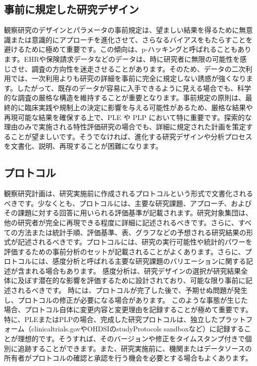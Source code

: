 \documentclass[
  11pt]{book}
\theoremstyle{definition}
\theoremstyle{definition}
\theoremstyle{definition}
\theoremstyle{definition}
\theoremstyle{remark}
\begin{document}
\subsection{事前に規定した研究デザイン}\label{ux4e8bux524dux306bux898fux5b9aux3057ux305fux7814ux7a76ux30c7ux30b6ux30a4ux30f3}

観察研究のデザインとパラメータの事前規定は、望ましい結果を得るために無意識または意識的にアプローチを進化させて、さらなるバイアスをもたらすことを避けるために極めて重要です。この傾向は、p-ハッキングと呼ばれることもあります。EHRや保険請求データなどのデータは、時に研究者に無限の可能性を感じさせ、調査の方向性を迷走させることがあります。そのため、データの二次利用では、一次利用よりも研究の詳細を事前に完全に規定しない誘惑が強くなります。したがって、既存のデータが容易に入手できるように見える場合でも、科学的な調査の厳格な構造を維持することが重要となります。事前規定の原則は、最終的に臨床実践や規制上の決定に影響を与える可能性があるため、厳格な結果や再現可能な結果を確保する上で、PLE や PLP において特に重要です。探索的な理由のみで実施される特性評価研究の場合でも、詳細に規定された計画を策定することが望ましいです。そうでなければ、進化する研究デザインや分析プロセスを文書化、説明、再現することが困難になります。

\subsection{プロトコル}\label{ux30d7ux30edux30c8ux30b3ux30eb}


観察研究計画は、研究実施前に作成されるプロトコルという形式で文書化されるべきです。少なくとも、プロトコルには、主要な研究課題、アプローチ、およびその課題に対する回答に用いられる評価基準が記載されます。研究対象集団は、他の研究者が完全に再現できる程度に詳細に記述されるべきです。さらに、すべての方法または統計手順、評価基準、表、グラフなどの予想される研究結果の形式が記述されるべきです。プロトコルには、研究の実行可能性や統計的パワーを評価するための事前分析のセットが記載されることがよくあります。さらに、プロトコルには、感度分析と呼ばれる主要な研究課題のバリエーションに関する記述が含まれる場合もあります。 感度分析は、研究デザインの選択が研究結果全体に及ぼす潜在的な影響を評価するために設計されており、可能な限り事前に記述されるべきです。 時には、プロトコルが完了した後で、予期せぬ問題が発生し、プロトコルの修正が必要になる場合があります。 このような事態が生じた場合、プロトコル自体に変更内容と変更理由を記録することが極めて重要です。特に、PLEまたはPLPの場合、完成した研究プロトコルは、独立したプラットフォーム（clinicaltrials.govやOHDSIのstudyProtocols sandboxなど）に記録することが理想的です。そうすれば、そのバージョンや修正をタイムスタンプ付きで個別に追跡することができます。また、研究実施前に、機関またはデータソースの所有者がプロトコルの確認と承認を行う機会を必要とする場合もよくあります。
\end{document}
